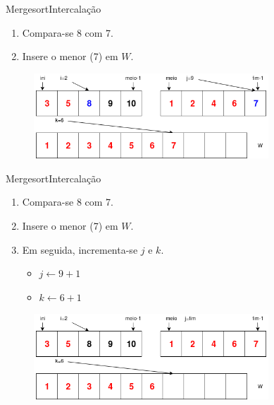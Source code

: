 \documentclass[aspectratio=169]{beamer}
\begin{document}
\begin{frame}{Mergesort}{Intercalação}
\begin{enumerate}
 \item Compara-se 8 com 7.
 \item Insere o menor (7) em $W$.
\end{enumerate}

\begin{figure}[!h]
  \centering
  \includegraphics[width=250pt]{imgs/merge/merge7_1.png}
  \label{fig_merge7_1}
\end{figure}
\end{frame}


\begin{frame}{Mergesort}{Intercalação}
\begin{enumerate}
 \item Compara-se 8 com 7.
 \item Insere o menor (7) em $W$.
 \item Em seguida, incrementa-se $j$ e $k$.
 \begin{itemize}
 \item $j\leftarrow 9 + 1$
 \item $k\leftarrow 6 + 1$
 \end{itemize}  
\end{enumerate}

\begin{figure}[!h]
  \centering
  \includegraphics[width=250pt]{imgs/merge/merge8.png}
  \label{fig_merge7_2}
\end{figure}
\end{frame}


\end{document}
